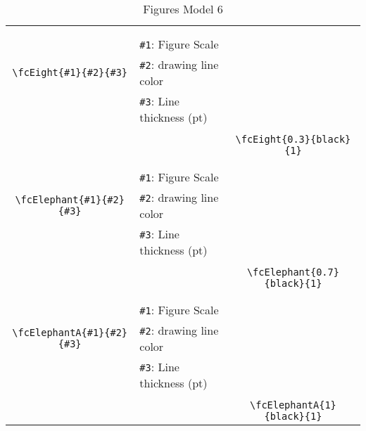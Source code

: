 \documentclass[x11names]{article}
\begin{document}
\begin{table}[H]
\begin{tabular}{|c|l|c|}
	&&\multirow{5}{*}{\fcEight{0.3}{black}{1}}\\	&&\\	&\verb|#1|: Figure Scale &\\	\verb|\fcEight{#1}{#2}{#3}|&	\verb|#2|: drawing line color &\\	&\verb|#3|: Line thickness (pt) &\\ &&\\&&	\verb|\fcEight{0.3}{black}{1}|\\\hline 	
	&&\multirow{5}{*}{\fcElephant{0.7}{black}{1}}\\	&&\\	&\verb|#1|: Figure Scale &\\	\verb|\fcElephant{#1}{#2}{#3}|&	\verb|#2|: drawing line color &\\	&\verb|#3|: Line thickness (pt) &\\ &&\\&&	\verb|\fcElephant{0.7}{black}{1}|\\\hline 	
	&&\multirow{5}{*}{\fcElephantA{1}{black}{1}}\\	&&\\	&\verb|#1|: Figure Scale &\\	\verb|\fcElephantA{#1}{#2}{#3}|&	\verb|#2|: drawing line color &\\	&\verb|#3|: Line thickness (pt) &\\ &&\\&&	\verb|\fcElephantA{1}{black}{1}|\\\hline 	\hline\end{tabular}\caption{Figures Model 6}\label{tab6}\end{table}
\end{document}
